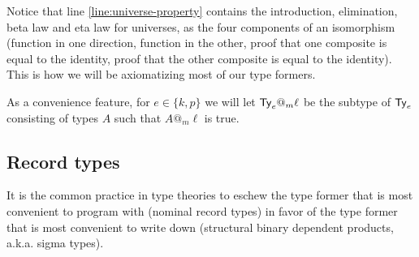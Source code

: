\documentclass[fleqn,leqno]{article}
\begin{document}
Notice that line \ref{line:universe-property} contains the introduction, elimination, beta law and eta law for universes, as the four components of an isomorphism (function in one direction, function in the other, proof that one composite is equal to the identity, proof that the other composite is equal to the identity). This is how we will be axiomatizing most of our type formers.

As a convenience feature, for $e \in \{k,p\}$ we will let $\mathsf{Ty}_e@_m\ell$ be the subtype of $\mathsf{Ty}_e$ consisting of types $A$ such that $A@_m\ell$ is true.

\subsection{Record types}

It is the common practice in type theories to eschew the type former that is most convenient to program with (nominal record types) in favor of the type former that is most convenient to write down (structural binary dependent products, a.k.a. sigma types).
\end{document}
